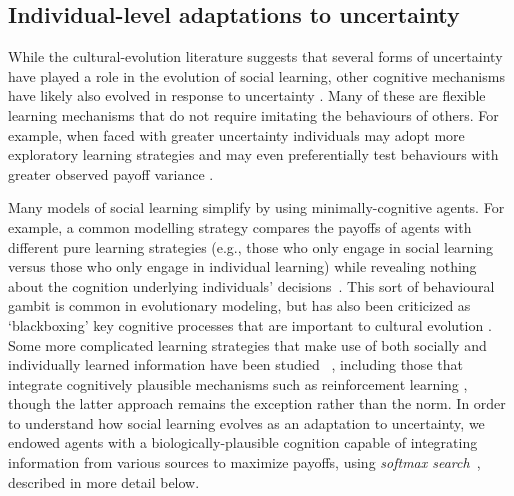 \documentclass[letterpaper,11.5pt]{scrartcl}
\begin{document}


\subsection{Individual-level adaptations to uncertainty} 

While the cultural-evolution literature suggests that several forms of uncertainty have played a role in the evolution of social learning, other cognitive mechanisms have likely also evolved in response to uncertainty \citep{volz2012,johnson2013evolution,van2018uncertainty}. Many of these are flexible learning mechanisms that do not require imitating the behaviours of others. For example, when faced with greater uncertainty individuals may adopt more exploratory learning strategies and may even preferentially test behaviours with greater observed payoff variance \citep{Wilson2014,Gershman2019}.

Many models of social learning simplify by using minimally-cognitive agents. For example, a common modelling strategy compares the payoffs of agents with different pure learning strategies (e.g., those who only engage in social learning versus those who only engage in individual learning) while revealing nothing about the cognition underlying individuals' decisions~\citep{BoydRicherson1985, Rogers1988, 
aoki2005}. This sort of behavioural gambit is common in evolutionary modeling, but has also been criticized as `blackboxing' key cognitive processes that are important to cultural evolution \citep{Heyes2016,Kendal2018}.  
Some more complicated learning strategies that make use of both socially and individually learned information have been studied ~\citep{Enquist2007, perreault2012bayesian}, including those that integrate cognitively plausible mechanisms such as reinforcement learning \citep{lindstrom2016co}, though the latter approach remains the exception rather than the norm. In order to understand how social learning evolves as an adaptation to uncertainty, we endowed agents with a biologically-plausible cognition capable of integrating information from various sources to maximize payoffs, using \emph{softmax search}~\citep{Gershman2019}, described in more detail below. 
\end{document}
